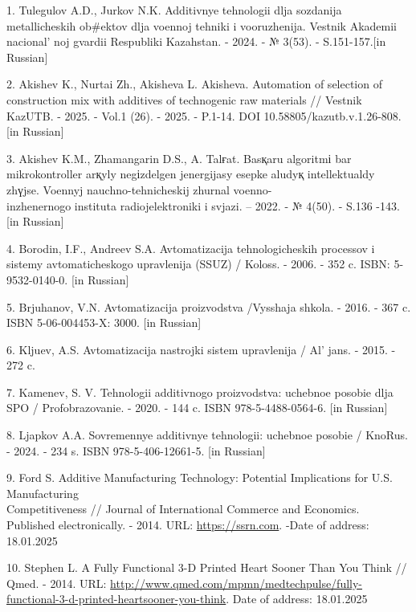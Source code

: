\begin{references}
1. Tulegulov A.D., Jurkov N.K. Additivnye tehnologii dlja sozdanija
metallicheskih ob\#ektov dlja voennoj tehniki i vooruzhenija. Vestnik
Akademii nacional' noj gvardii Respubliki Kazahstan. -
2024. - № 3(53). - S.151-157.{[}in Russian{]}

2. Akishev K., Nurtai Zh., Akisheva L. Akisheva. Automation of selection
of construction mix with additives of technogenic raw materials //
Vestnik KazUTB. - 2025. - Vol.1 (26). - 2025. - P.1-14. DOI
10.58805/kazutb.v.1.26-808. {[}in Russian{]}

3. Akishev K.M., Zhamangarin D.S., A. Talғat. Basқaru algoritmі bar
mikrokontroller arқyly negіzdelgen jenergijasy esepke aludyқ
intellektualdy zhүjse. Voennyj nauchno-tehnicheskij zhurnal
voenno-\\inzhenernogo instituta radiojelektroniki i svjazi. -- 2022. - №
4(50). - S.136 -143. {[}in Russian{]}

4. Borodin, I.F., Andreev S.A. Avtomatizacija tehnologicheskih processov
i sistemy avtomaticheskogo upravlenija (SSUZ) / Koloss. - 2006. - 352 c.
ISBN: 5-9532-0140-0. {[}in Russian{]}

5. Brjuhanov, V.N. Avtomatizacija proizvodstva /Vysshaja shkola. - 2016.
- 367 c. ISBN 5-06-004453-X: 3000. {[}in Russian{]}

6. Kljuev, A.S. Avtomatizacija nastrojki sistem upravlenija /
Al' jans. - 2015. - 272 c.

7. Kamenev, S. V. Tehnologii additivnogo proizvodstva: uchebnoe posobie
dlja SPO / Profobrazovanie. - 2020. - 144 c. ISBN 978-5-4488-0564-6.
{[}in Russian{]}

8. Ljapkov A.A. Sovremennye additivnye tehnologii: uchebnoe posobie /
KnoRus. - 2024. - 234 s. ISBN 978-5-406-12661-5. {[}in Russian{]}

9. Ford S. Additive Manufacturing Technology: Potential Implications for
U.S. Manufacturing \\Competitiveness // Journal of International Commerce
and Economics. Published electronically. - 2014.
URL: \href{https://ssrn.com/abstract=2501065}{https://ssrn.com}. -Date of address:
18.01.2025

10. Stephen L. A Fully Functional 3-D Printed Heart Sooner Than You
Think // Qmed. - 2014. URL:
\url{http://www.qmed.com/mpmn/medtechpulse/fully-functional-3-d-printed-heartsooner-you-think}.
Date of address: 18.01.2025
\end{references}

